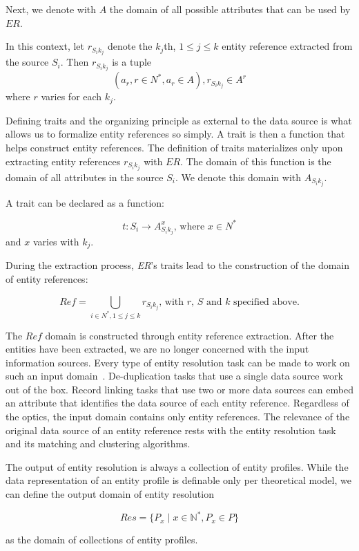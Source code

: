 Next, we denote with $A$ the domain of all possible attributes that can be
used by $ER$.

In this context, let $r_{{S_i}{k_j}}$ denote the $k_j$th, $1 \leq j \leq k$
entity reference extracted from the source $S_i$.
Then $r_{{S_i}{k_j}}$ is a tuple
\[
    (a_r, r \in N^*, a_r \in A), r_{{S_i}{k_j}} \in A^r
\]
where $r$ varies for each $k_j$.

Defining traits and the organizing principle as external to the data source
is what allows us to formalize entity references so simply.
A trait is then a function that helps construct entity references.
The definition of traits materializes only upon extracting entity references
$r_{{S_i}{k_j}}$ with $ER$.
The domain of this function is the domain of all attributes in the source
$S_i$.
We denote this domain with $A_{{S_i}{k_j}}$.

A trait can be declared as a function:

\[
    t: S_i \rightarrow A_{{S_i}{k_j}}^x\textrm{, where }x \in N^*
\]
and $x$ varies with $k_j$.

During the extraction process, \textit{ER}'s traits lead to the construction
of the domain of entity references:

\[
    Ref = \bigcup_{i \in N^*,1 \leq j \leq k} r_{{S_i}{k_j}}
    \textrm{, with } r \textrm{, }S \textrm{ and } k \textrm{ specified above.}
\]

The $Ref$ domain is constructed through entity reference extraction.
After the entities have been extracted, we are no longer concerned with the
input information sources.
Every type of entity resolution task can be made to work on such an input
domain~\cite{Pap19}.
De-duplication tasks that use a single data source work out of the box.
Record linking tasks that use two or more data sources can embed an
attribute that identifies the data source of each entity reference.
Regardless of the optics, the input domain contains only entity references.
The relevance of the original data source of an entity reference rests with
the entity resolution task and its matching and clustering algorithms.

The output of entity resolution is always a collection of entity profiles.
While the data representation of an entity profile is definable only per
theoretical model, we can define the output domain of entity resolution

\[
    Res=\{P_x \mid x \in \mathbb{N^*}, P_x \in P\}
\]

\noindent
as the domain of collections of entity profiles.

